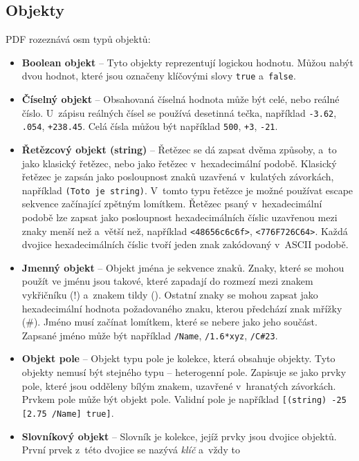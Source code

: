 \subsection*{Objekty}
PDF rozeznává osm typů objektů:
\begin{itemize}
    \item \textbf{Boolean objekt} -- Tyto objekty reprezentují logickou hodnotu.
    Můžou nabýt dvou hodnot, které jsou označeny klíčovými slovy \texttt{true}
    a~\texttt{false}.
    \item \textbf{Číselný objekt} -- Obsahovaná číselná hodnota může být celé,
    nebo reálné číslo. U~zápisu reálných čísel se používá desetinná tečka,
    například \texttt{-3.62}, \texttt{.054}, \texttt{+238.45}. Celá čísla můžou
    být například \texttt{500}, \texttt{+3}, \texttt{-21}.
    \item \textbf{Řetězcový objekt (string)} -- Řetězec se dá zapsat dvěma způsoby,
    a~to jako klasický řetězec, nebo jako řetězec v~hexadecimální podobě. Klasický
    řetězec je zapsán jako posloupnost znaků uzavřená v~kulatých závorkách,
    například \texttt{(Toto je string)}. V~tomto typu řetězce je možné používat
    escape sekvence začínající zpětným lomítkem. Řetězec psaný v~hexadecimální
    podobě lze zapsat jako posloupnost hexadecimálních číslic uzavřenou mezi znaky
    menší než a~větší než, například \texttt{<48656c6c6f>}, \texttt{<776F726C64>}.
    Každá dvojice hexadecimálních číslic tvoří jeden znak zakódovaný v~ASCII
    podobě.
    \item \textbf{Jmenný objekt} -- Objekt jména je sekvence znaků. Znaky, které
    se mohou použít ve jménu jsou takové, které zapadají do rozmezí mezi znakem
    vykřičníku (!) a~znakem tildy (\texttildelow). Ostatní znaky se mohou zapsat jako hexadecimální
    hodnota požadovaného znaku, kterou předchází znak mřížky (\#).
    Jméno musí začínat lomítkem, které se nebere jako jeho součást. Zapsané jméno
    může být například \texttt{/Name}, \texttt{/1.6*xyz}, \texttt{/C\#23}.
    \item \textbf{Objekt pole} -- Objekt typu pole je kolekce, která obsahuje
    objekty. Tyto objekty nemusí být stejného typu -- heterogenní pole.
    Zapisuje se jako prvky pole, které jsou odděleny bílým znakem, uzavřené
    v~hranatých závorkách. Prvkem pole může být objekt pole. Validní pole je
    například \texttt{[(string) -25 [2.75 /Name] true]}.
    \item \textbf{Slovníkový objekt} -- Slovník je kolekce, jejíž prvky jsou
    dvojice objektů. První prvek z~této dvojice se nazývá \emph{klíč} a~vždy to 

\end{itemize}
